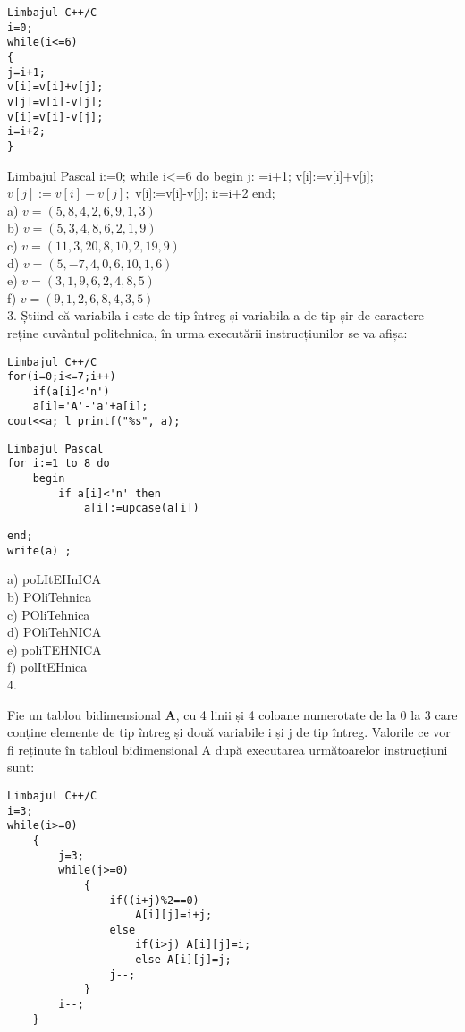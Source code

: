 \begin{verbatim}
Limbajul C++/C
i=0;
while(i<=6)
{
j=i+1;
v[i]=v[i]+v[j];
v[j]=v[i]-v[j];
v[i]=v[i]-v[j];
i=i+2;
}
\end{verbatim}

Limbajul Pascal i:=0; while i<=6 do begin j: =i+1; v[i]:=v[i]+v[j]; $v[j]:=v[i]-v[j] ;$ v[i]:=v[i]-v[j]; i:=i+2 end;\\
a) $v=(5,8,4,2,6,9,1,3)$\\
b) $v=(5,3,4,8,6,2,1,9)$\\
c) $v=(11,3,20,8,10,2,19,9)$\\
d) $v=(5,-7,4,0,6,10,1,6)$\\
e) $v=(3,1,9,6,2,4,8,5)$\\
f) $v=(9,1,2,6,8,4,3,5)$\\
3. Ș̦tiind că variabila i este de tip întreg și variabila a de tip șir de caractere reține cuvântul politehnica, în urma executării instrucțiunilor se va afișa:

\begin{verbatim}
Limbajul C++/C
for(i=0;i<=7;i++)
    if(a[i]<'n')
    a[i]='A'-'a'+a[i];
cout<<a; l printf("%s", a);
\end{verbatim}

\begin{verbatim}
Limbajul Pascal
for i:=1 to 8 do
    begin
        if a[i]<'n' then
            a[i]:=upcase(a[i])
\end{verbatim}

\begin{verbatim}
end;
write(a) ;
\end{verbatim}

a) poLItEHnICA\\
b) POliTehnica\\
c) POliTehnica\\
d) POliTehNICA\\
e) poliTEHNICA\\
f) polItEHnica\\
4.

Fie un tablou bidimensional $\mathbf{A}$, cu 4 linii și 4 coloane numerotate de la 0 la 3 care conține elemente de tip întreg și două variabile i și j de tip întreg. Valorile ce vor fi reținute în tabloul bidimensional A după executarea următoarelor instrucțiuni sunt:

\begin{verbatim}
Limbajul C++/C
i=3;
while(i>=0)
    {
        j=3;
        while(j>=0)
            {
                if((i+j)%2==0)
                    A[i][j]=i+j;
                else
                    if(i>j) A[i][j]=i;
                    else A[i][j]=j;
                j--;
            }
        i--;
    }
\end{verbatim}

